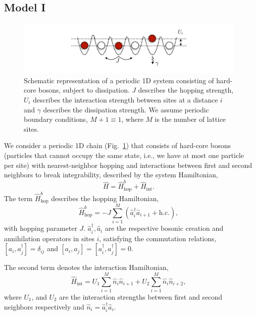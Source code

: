 \subsection{Model I}
    \begin{figure}[ht]
        \centering
        \includegraphics[width = \textwidth]{Chapters/Plots/Chapter4/Chapter3_Fig1.pdf}
        \caption{Schematic representation of a periodic 1D system consisting of hard-core bosons, subject to dissipation. $J$ describes the hopping strength, $U_i$ describes the interaction strength between sites at a distance $i$ and $\gamma$ describes the dissipation strength. We assume periodic boundary conditions, $M+1\equiv 1$, where $M$ is the number of lattice sites.}
        \label{fig:Chapter3_Fig1}
    \end{figure}
    
We consider a periodic 1D chain (Fig.~\ref{fig:Chapter3_Fig1}) that consists of hard-core bosons (particles that cannot occupy the same state, i.e., we have at most one particle per site) with nearest-neighbor hopping and interactions between first and second neighbors to break integrability, described by the system Hamiltonian,
\begin{equation}
\hat{H} =  \hat{H}^b_\text{hop} + \hat{H}_\text{int}.
\end{equation}
The term $\hat{H}^b_\text{hop}$ describes the hopping Hamiltonian,
\begin{equation}
\label{eq:ham}
\hat{H}^b_\text{hop} =-J \sum\limits_{i=1}^{M} ( \hat{a}^{\dagger}_i \hat{a}_{i+1} + \textrm{h.c.}),
\end{equation}
with hopping parameter $J$.  $\hat{a}^\dagger_i, \hat{a}_i$ are the respective bosonic creation and annihilation operators in sites $i$, satisfying the commutation relations, $[a_i,a_j^\dagger] = \delta_{ij}$ and $[a_i,a_j]= [a_i^\dagger, a_j^\dagger] = 0$.

The second term denotes the interaction Hamiltonian,
\begin{equation}
\hat{H}_\text{int} = U_1\sum\limits_{i=1}^{M} \hat{n}_i \hat{n}_{i+1}
+ U_2\sum\limits_{i=1}^{M} \hat{n}_i \hat{n}_{i+2},
\end{equation}
where $U_1$, and $U_2$ are the interaction strengths between first and second neighbors respectively and $\hat{n}_i=\hat{a}_i^\dagger \hat{a}_i$. 

